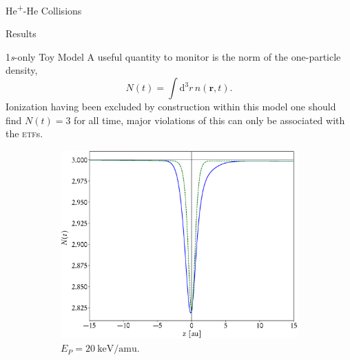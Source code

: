 \documentclass[letterpaper, 11 pt]{report}
\begin{document}
\begin{chapter}{\texorpdfstring{He\textsuperscript{+}}{He+}-He Collisions \label{chap:hephe}}
\begin{section}{Results \label{sec:hephe-disc}}
\begin{subsection}{1\textit{s}-only Toy Model \label{sec:toy}}
         A useful quantity to monitor is the norm of the one-particle density,
         \begin{equation}
            N(t) = \int \mathrm{d}^3 r \, n(\mathbf{r},t).
         \end{equation}
         Ionization having been excluded by construction within this model one should find $N(t) = 3$
         for all time, major violations of this can only be associated with the \textsc{etf}s.

         \begin{figure}[t]
            \centering
            \begin{subfigure}{.5\textwidth}
               \centering
               \includegraphics[width=\linewidth]{./images/toymodel/dNorm-1s-20.eps}
               \caption{$E_P = 20~\mathrm{keV}/\mathrm{amu}$. \label{fig:toy20}}
            \end{subfigure}%
            \begin{subfigure}{.5\textwidth}
               \centering

\end{subfigure}
\end{figure}
\end{subsection}
\end{section}
\end{chapter}
\end{document}
